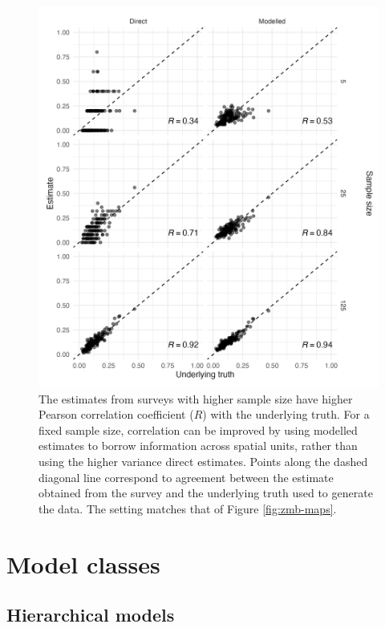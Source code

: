 \documentclass[a4paper, nobind]{templates/ociamthesis}
\begin{document}
\begin{figure}

{\centering \includegraphics[width=0.95\linewidth]{figures/bayesian/zmb-scatter} 

}

\caption{The estimates from surveys with higher sample size have higher Pearson correlation coefficient (\(R\)) with the underlying truth. For a fixed sample size, correlation can be improved by using modelled estimates to borrow information across spatial units, rather than using the higher variance direct estimates. Points along the dashed diagonal line correspond to agreement between the estimate obtained from the survey and the underlying truth used to generate the data. The setting matches that of Figure \ref{fig:zmb-maps}.}\label{fig:zmb-scatter}
\end{figure}

\hypertarget{hierarchical-lgm-elgm}{%
\section{Model classes}\label{hierarchical-lgm-elgm}}

\hypertarget{hierarchical}{%
\subsection{Hierarchical models}\label{hierarchical}}
\end{document}
